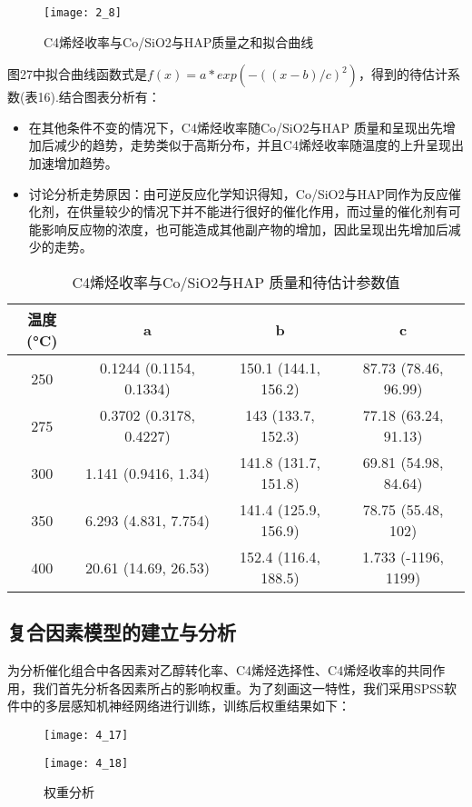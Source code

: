 \documentclass[withoutpreface,bwprint]{cumcmthesis} %
\begin{document}
\begin{figure}[!h]
	\centering
	\texttt{[image: 2\_8]}
	\caption{C4烯烃收率与Co/SiO2与HAP质量之和拟合曲线}
	\label{fig:circuit-diagram1}
\end{figure}
图27中拟合曲线函数式是$f(x) = a*exp(-((x-b)/c)^2)$，得到的待估计系数(表16).结合图表分析有：
\begin{itemize}
	\item 在其他条件不变的情况下，C4烯烃收率随Co/SiO2与HAP 质量和呈现出先增加后减少的趋势，走势类似于高斯分布，并且C4烯烃收率随温度的上升呈现出加速增加趋势。
	\item 讨论分析走势原因：由可逆反应化学知识得知，Co/SiO2与HAP同作为反应催化剂，在供量较少的情况下并不能进行很好的催化作用，而过量的催化剂有可能影响反应物的浓度，也可能造成其他副产物的增加，因此呈现出先增加后减少的走势。
\end{itemize}   
\begin{table}[!htbp]
	\caption{C4烯烃收率与Co/SiO2与HAP 质量和待估计参数值}\label{tab:001} \centering
	\begin{tabular}{cccc}
		\toprule[1.5pt]
		温度(°C) & a & b & c \\
		\midrule[1pt]
		250 & 0.1244  (0.1154, 0.1334) & 150.1  (144.1, 156.2) &   87.73  (78.46, 96.99) \\
		275 & 0.3702  (0.3178, 0.4227) &   143  (133.7, 152.3) & 77.18  (63.24, 91.13) \\
		300 &1.141  (0.9416, 1.34) & 141.8  (131.7, 151.8) &    69.81  (54.98, 84.64)\\
		350 &  6.293  (4.831, 7.754) & 141.4  (125.9, 156.9) &  78.75  (55.48, 102) \\
		400 &   20.61  (14.69, 26.53) & 152.4  (116.4, 188.5) &  1.733  (-1196, 1199)  \\
		\bottomrule[1.5pt]
	\end{tabular}
\end{table}
 
\newpage    
\subsection{复合因素模型的建立与分析}
为分析催化组合中各因素对乙醇转化率、C4烯烃选择性、C4烯烃收率的共同作用，我们首先分析各因素所占的影响权重。为了刻画这一特性，我们采用SPSS软件中的多层感知机神经网络进行训练，训练后权重结果如下：

\begin{figure}[!h]
	\centering
	\begin{minipage}[c]{0.45\textwidth}
		\centering
		\texttt{[image: 4\_17]}
		\label{fig:sample-figure-a}
	\end{minipage}
	\begin{minipage}[c]{0.45\textwidth}
		\centering
		\texttt{[image: 4\_18]}
		\label{fig:sample-figure-b}
	\end{minipage}
	\caption{权重分析}
	\label{fig:sample-figure}
\end{figure}
\end{document}
